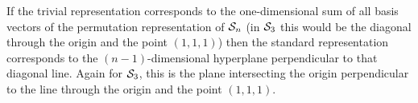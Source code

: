 If the trivial representation corresponds to the one-dimensional sum of all basis vectors of the permutation representation of $\mathcal{S}_n$ (in $\mathcal{S}_3$ this would be the diagonal through the origin and the point $(1,1,1)$) then the standard representation corresponds to the $(n-1)$-dimensional hyperplane perpendicular to that diagonal line. Again for $\mathcal{S}_3$, this is the plane intersecting the origin perpendicular to the line through the origin and the point $(1,1,1)$.
